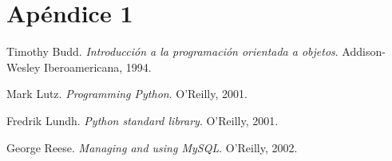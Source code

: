 \documentclass[a4paper, 12pt]{book}
\begin{document}

\appendix
\chapter{Apéndice 1}
\label{app:primer}



\begin{thebibliography}{25}


 Timothy Budd. \textit{Introducci\'on a la programaci\'on orientada a objetos}. Addison-Wesley Iberoamericana, 1994.

 Mark Lutz. \textit{Programming Python}. O'Reilly, 2001.

 Fredrik Lundh. \textit{Python standard library}. O'Reilly,
2001.

 George Reese. \textit{Managing and using MySQL}. O'Reilly,
2002.

\end{thebibliography}
\end{document}
